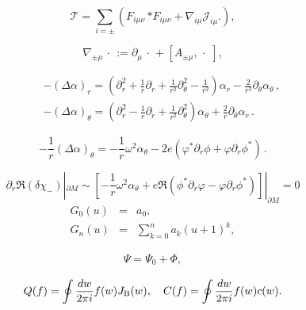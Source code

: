 \documentclass[]{article}
\begin{document}
\begin{equation}\label{eq:topo}
\mathcal{T} = \sum_{i=\pm}\left(
F_{i\mu\nu}\,{*F_{i\mu\nu}}+\nabla_{i\mu}\mathcal{J}_{i\mu}.
\right),
\end{equation}

\begin{equation}\label{nabla1}
\nabla_{\pm\mu}\,\cdot\,:=
\partial_\mu\,\cdot\,+[A_{\pm\mu},\,\cdot\,\,],
\end{equation}












\begin{eqnarray}
	&&-(\Delta \alpha)_r = \left( \partial_r^2 + \frac 1r \partial_r +
	\frac 1{r^2} \partial_\theta^2 -\frac 1{r^2} \right) \alpha_r -
	\frac 2{r^3} \partial_\theta \alpha_\theta \,,\nonumber \\
	&&-(\Delta \alpha)_\theta = \left( \partial_r^2 -\frac 1r
	\partial_r +\frac 1{r^2} \partial_\theta^2 \right) \alpha_\theta +
	\frac 2r \partial_\theta \alpha_r \,.\label{apa4}
\end{eqnarray}

\begin{equation}
	-\frac 1r (\Delta \alpha)_\theta = -\frac 1r \omega^2
	\alpha_\theta - 2e \left( \varphi^* \partial_r \phi +
	\varphi\partial_r \phi^* \right) \,. \label{apa5}
\end{equation}

\begin{equation}
	\partial_r \Re (\delta \chi_-) |_{\partial M}\sim
	\left[ -\frac 1r \omega^2 \alpha_\theta + e\Re (\phi^*
	\partial_r \varphi -\varphi \partial_r \phi^*) \right]|_{\partial M}=0
	\label{apa6}
\end{equation}\begin{eqnarray}
	\nonumber
	G_0(u) &=& a_0, \\
	\nonumber
	G_n(u) &=& \sum\limits_{k=0}^{n}  
	a_k \left(u+1\right)^k,
\end{eqnarray}



\begin{eqnarray}
	\Psi=\Psi_0+\Phi,
\end{eqnarray}



\begin{eqnarray}
	Q(f)=\oint \frac{dw}{2\pi i} f(w) J_{\rm B}(w),\ \ \ 
	C(f)=\oint \frac{dw}{2\pi i} f(w) c(w).
\end{eqnarray}
\end{document}
